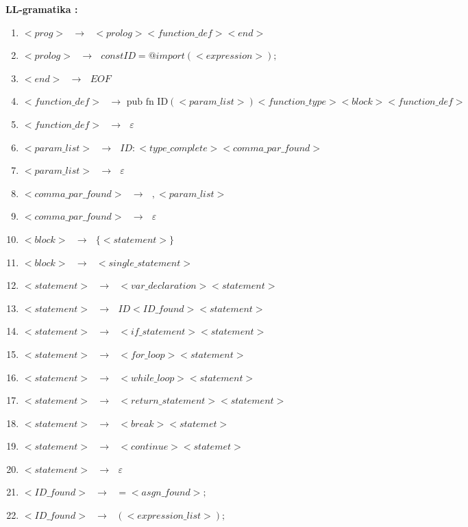 \documentclass[12pt]{article}
\begin{document}
\newpage

 \Large \textbf{LL-gramatika :} \\ \normalsize
\noindent\makebox[\linewidth]{\rule{\textwidth}{0.4pt}}

\begin{enumerate}
\item $<prog>\text{ }\to \text{ }<prolog> <function\_def> <end>$
\item $<prolog> \text{ }\to \text{ } const ID = @import ( <expression> ) ;$
\item $<end> \text{ }\to \text{ } EOF$
\item $<function\_def> \text{ }\to \text{ pub fn ID}  (<param\_list>) <function\_type> <block> <function\_def>$
\item $<function\_def> \text{ }\to \text{ } \varepsilon$
\item $<param\_list> \text{ }\to \text{ } ID : <type\_complete> <comma\_par\_found>$
\item $<param\_list> \text{ }\to \text{ } \varepsilon$
\item $<comma\_par\_found> \text{ }\to \text{ } , <param\_list>$
\item $<comma\_par\_found> \text{ }\to \text{ } \varepsilon$
\item $<block> \text{ }\to \text{ } \{ <statement> \}$
\item $<block> \text{ }\to \text{ } <single\_statement>$
\item $<statement> \text{ }\to \text{ } <var\_declaration> <statement>$
\item $<statement> \text{ }\to \text{ } ID <ID\_found> <statement>$
\item $<statement> \text{ }\to \text{ } <if\_statement> <statement>$
\item $<statement> \text{ }\to \text{ } <for\_loop> <statement>$
\item $<statement> \text{ }\to \text{ } <while\_loop> <statement> $
\item $<statement> \text{ }\to \text{ } <return\_statement> <statement>$
\item $<statement> \text{ }\to \text{ } <break> <statemet>$
\item $<statement> \text{ }\to \text{ } <continue> <statemet>$
\item $<statement> \text{ }\to \text{ } \varepsilon$
\item $<ID\_found> \text{ }\to \text{ } = <asgn\_found> ;$
\item $<ID\_found> \text{ }\to \text{ } ( <expression\_list> );$

\end{enumerate}
\end{document}
